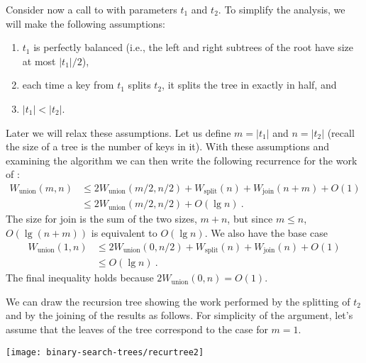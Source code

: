 Consider now a call to  with parameters
$t_1$ and $t_2$.  To simplify the analysis, we will make the following
assumptions:
\begin{enumerate}
\item $t_1$ is perfectly balanced (i.e., the left and right subtrees of
  the root have size at most $|t_1|/2$), 
\item each time a key from $t_1$ splits $t_2$, it splits the tree in
  exactly in half, and
\item $|t_1| < |t_2|$.
\end{enumerate}
Later we will relax these assumptions.  Let us define $m = |t_1|$ and
$n = |t_2|$ (recall the size of a tree is the number of keys in it).
With these assumptions and examining the algorithm we can then write
the following recurrence for the work of :
\begin{align*}
  W_{\mbox{union}}(m, n) &\leq 2W_{\mbox{union}}(m/2,n/2) + W_{\mbox{split}}(n)
+ W_{\mbox{join}}(n+m) + O(1)\\
   & \leq  2W_{\mbox{union}}(m/2, n/2) + O(\lg n)~.
\end{align*}  
The size for join is the sum of the two sizes, $m+n$, but since 
$m \leq n$, $O(\lg (n + m))$ is equivalent to $O(\lg n)$.
We also have the base case
\begin{align*}
  W_{\mbox{union}}(1, n) & \leq 2W_{\mbox{union}}(0,n/2) + W_{\mbox{split}}(n)
+ W_{\mbox{join}}(n) + O(1)\\
         & \leq O(\lg n)~.
\end{align*}
The final inequality holds because $2W_{\mbox{union}}(0,n) = O(1)$.

We can draw the recursion tree showing the work performed by the
splitting of $t_2$ and by the joining of the results as follows.  For
simplicity of the argument, let's assume that the leaves of the tree
correspond to the case for $m = 1$.


\begin{center}
  \texttt{[image: binary-search-trees/recurtree2]}
\end{center}
%

